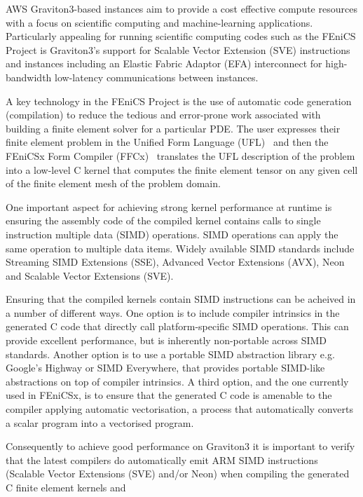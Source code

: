 AWS Graviton3-based instances aim to provide a cost effective compute resources
with a focus on scientific computing and machine-learning applications.
Particularly appealing for running scientific computing codes such as the
FEniCS Project is Graviton3's support for Scalable Vector Extension (SVE)
instructions and instances including an Elastic Fabric Adaptor (EFA)
interconnect for high-bandwidth low-latency communications between instances.

A key technology in the FEniCS Project is the use of automatic code generation
(compilation) to reduce the tedious and error-prone work associated with
building a finite element solver for a particular PDE. The user expresses their
finite element problem in the Unified Form Language
(UFL)~\cite{alnaes_unified_2014} and then the FEniCSx Form Compiler
(FFCx)~\cite{kirby_compiler_2006} translates the UFL description of the problem
into a low-level C kernel that computes the finite element tensor on any given
cell of the finite element mesh of the problem domain.

One important aspect for achieving strong kernel performance at runtime is
ensuring the assembly code of the compiled kernel contains calls to single
instruction multiple data (SIMD) operations. SIMD operations can apply the same
operation to multiple data items. Widely available SIMD standards include
Streaming SIMD Extensions (SSE), Advanced Vector Extensions (AVX), Neon and
Scalable Vector Extensions (SVE). 

Ensuring that the compiled kernels contain SIMD instructions can be acheived in
a number of different ways. One option is to include compiler intrinsics in the
generated C code that directly call platform-specific SIMD operations. This can
provide excellent performance, but is inherently non-portable across SIMD
standards. Another option is to use a portable SIMD abstraction library e.g.
Google's Highway or SIMD Everywhere, that provides portable SIMD-like
abstractions on top of compiler intrinsics. A third option, and the one
currently used in FEniCSx, is to ensure that the generated C code is amenable
to the compiler applying automatic vectorisation, a process that automatically
converts a scalar program into a vectorised program.
 
Consequently to achieve good performance on Graviton3 it is important to verify
that the latest compilers do automatically emit ARM SIMD instructions (Scalable
Vector Extensions (SVE) and/or Neon) when compiling the generated C finite
element kernels and 

